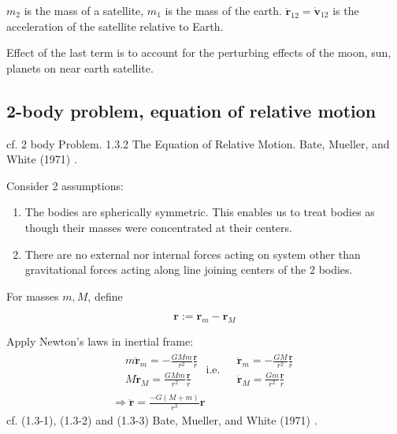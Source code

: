 \documentclass[10pt]{amsart}
\begin{document}
\begin{multicols*}{2}
$m_2$ is the mass of a satellite, $m_1$ is the mass of the earth. $\ddot{\mathbf{r}}_{12} = \dot{\mathbf{v}}_{12}$ is the acceleration of the satellite relative to Earth.

Effect of the last term is to account for the perturbing effects of the moon, sun, planets on near earth satellite. 

\subsection{2-body problem, equation of relative motion}

cf. 2 body Problem. 1.3.2 The Equation of Relative Motion. Bate, Mueller, and White (1971) \cite{BMW1971}.

Consider 2 assumptions:

\begin{enumerate}
	\item The bodies are spherically symmetric. This enables us to treat bodies as though their masses were concentrated at their centers.
	\item There are no external nor internal forces acting on system other than gravitational forces acting along line joining centers of the 2 bodies.
\end{enumerate}

For masses $m, M$, define

\begin{equation}
\mathbf{r} := \mathbf{r}_m - \mathbf{r}_M	
\end{equation}

Apply Newton's laws in inertial frame:
\begin{equation}
	\begin{gathered}
		\begin{aligned}
			& m \ddot{\mathbf{r}}_m = - \frac{GM m}{r^2} \frac{\mathbf{r}}{r} \\
			& M \ddot{\mathbf{r}}_M =  \frac{GM m}{r^2} \frac{\mathbf{r}}{r} 
		\end{aligned} \text{ i.e. } 		\begin{aligned}
		&  \ddot{\mathbf{r}}_m = - \frac{GM }{r^2} \frac{\mathbf{r}}{r} \\
		&  \ddot{\mathbf{r}}_M =  \frac{G m}{r^2} \frac{\mathbf{r}}{r} 
	\end{aligned} \\
\Longrightarrow \ddot{\mathbf{r}} = \frac{ - G (M + m) }{r^3 } \mathbf{r}
	\end{gathered}
\end{equation}
cf. (1.3-1), (1.3-2) and (1.3-3) Bate, Mueller, and White (1971) \cite{BMW1971}.


\end{multicols*}
\end{document}
